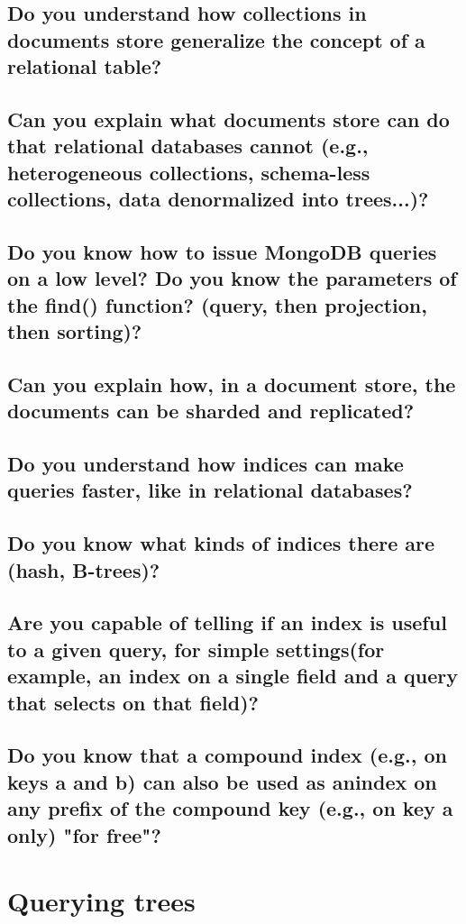 \documentclass{article}
\begin{document}
\subsection{Do you understand how collections in documents store generalize the concept of a relational table?}
\subsection{Can you explain what documents store can do that relational databases cannot (e.g., heterogeneous collections, schema-less collections, data denormalized into trees...)?}
\subsection{Do you know how to issue MongoDB queries on a low level? Do you know the parameters of the find() function? (query, then projection, then sorting)?}
\subsection{Can you explain how, in a document store, the documents can be sharded and replicated?}
\subsection{Do you understand how indices can make queries faster, like in relational databases?}
\subsection{Do you know what kinds of indices there are (hash, B-trees)?}
\subsection{Are you capable of telling if an index is useful to a given query, for simple settings(for example, an index on a single field and a query that selects on that field)?}
\subsection{Do you know that a compound index (e.g., on keys a and b) can also be used as anindex on any prefix of the compound key (e.g., on key a only) "for free"?}

\pagebreak

\section{Querying trees}
\end{document}
